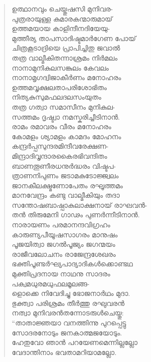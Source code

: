 \begin{verse}
ഉത്ഥാനവും ചെയ്തുഷസി മുനിവര-\\
പുത്രരായുള്ള കുമാരകന്മാരുമായ്\\
ഉത്തമയായ കാളിന്ദീനദിയേയു-\\
മുത്തീര്യ താപസാദിഷ്ടമാര്‍ഗേണ പോയ്\\
ചിത്രകൂടാദ്രിയെ പ്രാപിച്ചിതു ജവാല്‍\\
തത്ര വാല്മീകിതന്നാശ്രമം നിര്‍മലം\\
നാനാമുനികുലസങ്കുലം കേവലം\\
നാനാമൃഗദ്വിജാകീര്‍ണം മനോഹരം\\
ഉത്തമവൃക്ഷലതാപരിശോഭിതം\\
നിത്യകുസുമഫലദലസംയുതം\\
തത്ര ഗത്വാ സമാസീനം മുനികുല-\\
സത്തമം ദൃഷ്ട്വാ നമസ്കരിച്ചീടിനാന്‍.\\
രാമം രമാവരം വീരം മനോഹരം\\
കോമളം ശ്യാമളം കാമദം മോഹനം\\
കന്ദ്രര്‍പ്പസുന്ദരമിന്ദീവരേക്ഷണ-\\
മിന്ദ്രാദിവൃന്ദാരകൈരഭിവന്ദിതം\\
ബാണതൂണീരധനുര്‍ദ്ധരം വിഷ്ടപ-\\
ത്രാണനിപുണം ജടാമകുടോജ്ജ്വലം\\
ജാനകീലക്ഷ്മണോപേതം രഘൂത്തമം\\
മാനവേന്ദ്രം കണ്ടു വാല്മീകിയും തദാ\\
സന്തോഷബാഷ്പാകുലാക്ഷനായ് രാഘവന്‍-\\
തന്‍ തിരുമേനി ഗാഢം പുണര്‍ന്നീടിനാന്‍.\\
നാരായണം പരമാനന്ദവിഗ്രഹം\\
കാരുണ്യപീയൂഷസാഗരം മാനുഷം\\
പൂജയിത്വാ ജഗല്‍പൂജ്യം ജഗന്മയം\\
രാജീവലോചനം രാജേന്ദ്രശേഖരം\\
ഭക്തിപൂണ്ടര്‍ഘ്യപാദ്യാദികള്‍ക്കൊണ്ടഥ\\
മുക്തിപ്രദനായ നാഥനു സാദരം\\
പക്വമധുരമധുഫലമൂലങ്ങ-\\
ളൊക്കെ നിവേദിച്ചു ഭോജനാര്‍ഥം മുദാ.\\
ഭുക്ത്വാ പരിശ്രമം തീര്‍ത്തു രഘുവരന്‍\\
നത്വാ മുനിവരന്‍തന്നോടരുള്‍ചെയ്തു:\\
“താതാജ്ഞയാ വനത്തിന്നു പുറപ്പെട്ടു\\
സോദരനോടും ജനകാത്മജയോടും.\\
ഹേതുവോ ഞാന്‍ പറയേണമെന്നില്ലല്ലോ\\
വേദാന്തിനാം ഭവതാമറിയാമല്ലോ.\\

\end{verse}
